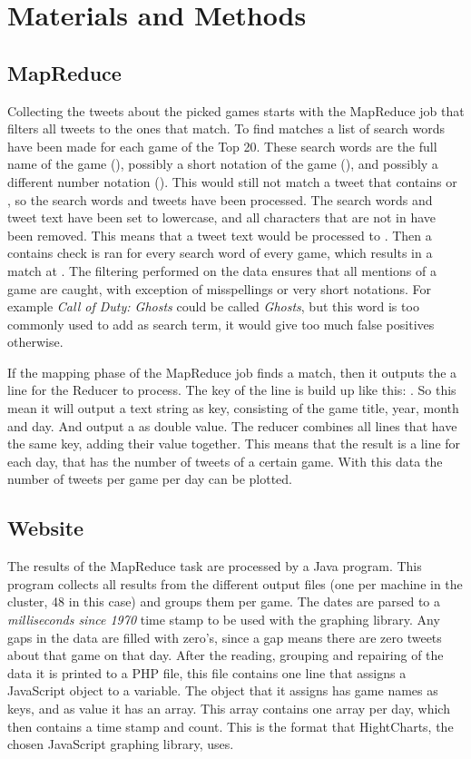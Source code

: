 \section{Materials and Methods}
\subsection{MapReduce}
Collecting the tweets about the picked games starts with the MapReduce job that filters all tweets to the ones that match. To find matches a list of search words have been made for each game of the Top 20. These search words are the full name of the game (), possibly a short notation of the game (), and possibly a different number notation (). This would still not match a tweet that contains  or , so the search words and tweets have been processed. The search words and tweet text have been set to lowercase, and all characters that are not in  have been removed. This means that a tweet text  would be processed to . Then a contains check is ran for every search word of every game, which results in a match at . The filtering performed on the data ensures that all mentions of a game are caught, with exception of misspellings or very short notations. For example \emph{Call of Duty: Ghosts} could be called \emph{Ghosts}, but this word is too commonly used to add as search term, it would give too much false positives otherwise.

If the mapping phase of the MapReduce job finds a match, then it outputs the a line for the Reducer to process. The key of the line is build up like this: . So this mean it will output a text string as key, consisting of the game title, year, month and day. And output a  as double value. The reducer combines all lines that have the same key, adding their value together. This means that the result is a line for each day, that has the number of tweets of a certain game. With this data the number of tweets per game per day can be plotted.

\subsection{Website}
The results of the MapReduce task are processed by a Java program. This program collects all results from the different output files (one per machine in the cluster, 48 in this case) and groups them per game. The dates are parsed to a \emph{milliseconds since 1970} time stamp to be used with the graphing library. Any gaps in the data are filled with zero's, since a gap means there are zero tweets about that game on that day. After the reading, grouping and repairing of the data it is printed to a PHP file, this file contains one line that assigns a JavaScript object to a variable. The object that it assigns has game names as keys, and as value it has an array. This array contains one array per day, which then contains a time stamp and count. This is the format that HightCharts, the chosen JavaScript graphing library, uses.

